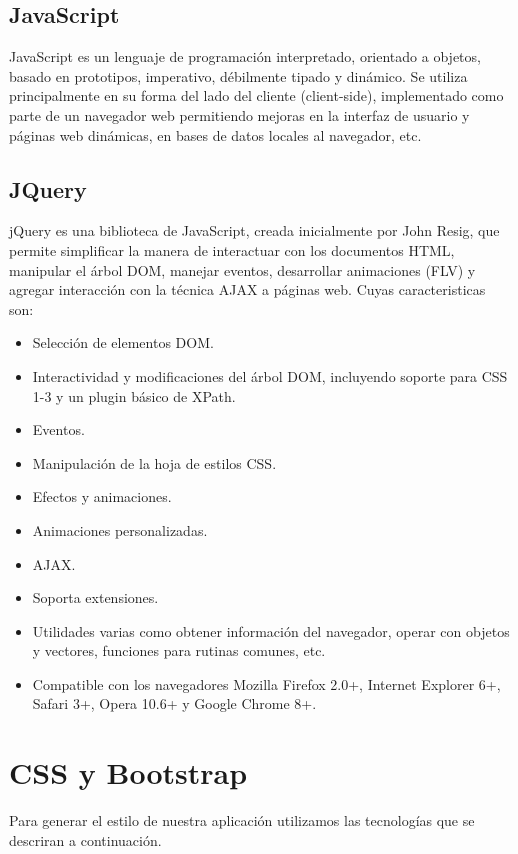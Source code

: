 \subsection{JavaScript}
JavaScript es un lenguaje de programación interpretado, orientado a objetos, basado en prototipos, imperativo, débilmente tipado y dinámico. 
Se utiliza principalmente en su forma del lado del cliente (client-side), implementado como parte de un navegador web permitiendo mejoras en 
la interfaz de usuario y páginas web dinámicas, en bases de datos locales al navegador, etc.

\subsection{JQuery}
jQuery es una biblioteca de JavaScript, creada inicialmente por John Resig, que permite simplificar la manera de interactuar con los documentos HTML,
manipular el árbol DOM, manejar eventos, desarrollar animaciones (FLV) y agregar interacción con la técnica AJAX a páginas web. Cuyas caracteristicas son:

\begin{itemize}
  \item Selección de elementos DOM.
  \item Interactividad y modificaciones del árbol DOM, incluyendo soporte para CSS 1-3 y un plugin básico de XPath.
  \item Eventos.
  \item Manipulación de la hoja de estilos CSS.
  \item Efectos y animaciones.
  \item Animaciones personalizadas.
  \item AJAX.
  \item Soporta extensiones.
  \item Utilidades varias como obtener información del navegador, operar con objetos y vectores, funciones para rutinas comunes, etc.
  \item Compatible con los navegadores Mozilla Firefox 2.0+, Internet Explorer 6+, Safari 3+, Opera 10.6+ y Google Chrome 8+.
\end{itemize}

\section{CSS y Bootstrap}
\label{2:sec7}

Para generar el estilo de nuestra aplicación utilizamos las tecnologías que se descriran a continuación.

